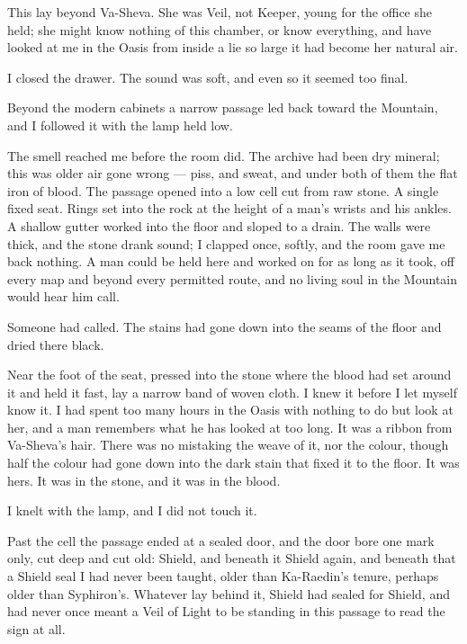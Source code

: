 This lay beyond Va-Sheva. She was Veil, not Keeper, young for the office she held; she might know nothing of this chamber, or know everything, and have looked at me in the Oasis from inside a lie so large it had become her natural air.\par

I closed the drawer. The sound was soft, and even so it seemed too final.\par

Beyond the modern cabinets a narrow passage led back toward the Mountain, and I followed it with the lamp held low.\par

The smell reached me before the room did. The archive had been dry mineral; this was older air gone wrong --- piss, and sweat, and under both of them the flat iron of blood. The passage opened into a low cell cut from raw stone. A single fixed seat. Rings set into the rock at the height of a man's wrists and his ankles. A shallow gutter worked into the floor and sloped to a drain. The walls were thick, and the stone drank sound; I clapped once, softly, and the room gave me back nothing. A man could be held here and worked on for as long as it took, off every map and beyond every permitted route, and no living soul in the Mountain would hear him call.\par

Someone had called. The stains had gone down into the seams of the floor and dried there black.\par

Near the foot of the seat, pressed into the stone where the blood had set around it and held it fast, lay a narrow band of woven cloth. I knew it before I let myself know it. I had spent too many hours in the Oasis with nothing to do but look at her, and a man remembers what he has looked at too long. It was a ribbon from Va-Sheva's hair. There was no mistaking the weave of it, nor the colour, though half the colour had gone down into the dark stain that fixed it to the floor. It was hers. It was in the stone, and it was in the blood.\par

I knelt with the lamp, and I did not touch it.\par

Past the cell the passage ended at a sealed door, and the door bore one mark only, cut deep and cut old: Shield, and beneath it Shield again, and beneath that a Shield seal I had never been taught, older than Ka-Raedin's tenure, perhaps older than Syphiron's. Whatever lay behind it, Shield had sealed for Shield, and had never once meant a Veil of Light to be standing in this passage to read the sign at all.\par

